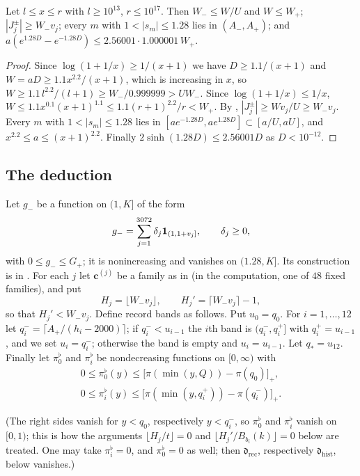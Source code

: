 \documentclass[11pt,colorlinks]{charlie}
\begin{document}
\begin{lemma}\label{lem:windows}
Let $l\le x\le r$ with $l\ge10^{13}$, $r\le10^{17}$. Then $W_-\le W/U$ and $W\le W_+$; $|J_j^\pm|\ge W_-v_j$; every $m$ with $1<|s_m|\le1.28$ lies in $(A_-,A_+)$; and $a(e^{1.28D}-e^{-1.28D})\le2.56001\cdot1.000001\,W_+$.
\end{lemma}
\begin{proof}
Since $\log(1+1/x)\ge1/(x+1)$ we have $D\ge1.1/(x+1)$ and $W=aD\ge1.1x^{2.2}/(x+1)$, which is increasing in $x$, so $W\ge1.1\,l^{2.2}/(l+1)\ge W_-/0.999999>UW_-$. Since $\log(1+1/x)\le1/x$, $W\le1.1x^{0.1}(x+1)^{1.1}\le1.1(r+1)^{2.2}/r<W_+$. By , $|J_j^\pm|\ge Wv_j/U\ge W_-v_j$. Every $m$ with $1<|s_m|\le1.28$ lies in $[ae^{-1.28D},ae^{1.28D}]\subset[a/U,aU]$, and $x^{2.2}\le a\le(x+1)^{2.2}$. Finally $2\sinh(1.28D)\le2.56001D$ as $D<10^{-12}$.
\end{proof}

\subsection{The deduction}\label{sec:deduction}
Let $g_-$ be a function on $(1,K]$ of the form
\begin{equation}\label{eq:gminus}
 g_-=\sum_{j=1}^{3072}\delta_j\mathbf{1}_{(1,1+v_j]},\qquad\delta_j\ge0,
\end{equation}
with $0\le g_-\le G_+$; it is nonincreasing and vanishes on $(1.28,K]$. Its construction is in . For each $j$ let $\mathbf c^{(j)}$ be a family as in  (in the computation, one of $48$ fixed families), and put
\[
 H_j=\lfloor W_-v_j\rfloor,\qquad H_j'=\lceil W_-v_j\rceil-1,
\]
so that $H_j'<W_-v_j$. Define record bands as follows. Put $u_0=q_0$. For $i=1,\dots,12$ let $q_i^-=\lceil A_+/(h_i-2000)\rceil$; if $q_i^-<u_{i-1}$ the $i$th band is $(q_i^-,q_i^+]$ with $q_i^+=u_{i-1}$, and we set $u_i=q_i^-$; otherwise the band is empty and $u_i=u_{i-1}$. Let $q_*=u_{12}$. Finally let $\pi_0^\flat$ and $\pi_i^\flat$ be nondecreasing functions on $[0,\infty)$ with
\begin{equation}\label{eq:piflat}
\begin{gathered}
 0\le\pi_0^\flat(y)\le\big[\pi(\min(y,Q))-\pi(q_0)\big]_+,\\
 0\le\pi_i^\flat(y)\le\big[\pi(\min(y,q_i^+))-\pi(q_i^-)\big]_+ .
\end{gathered}
\end{equation}

(The right sides vanish for $y<q_0$, respectively $y<q_i^-$, so $\pi_0^\flat$ and $\pi_i^\flat$ vanish on $[0,1)$; this is how the arguments $\lfloor H_j/t\rfloor=0$ and $\lfloor H_j'/B_{b_i}(k)\rfloor=0$ below are treated. One may take $\pi_i^\flat=0$, and $\pi_0^\flat=0$ as well; then $\mathfrak d_{\mathrm{rec}}$, respectively $\mathfrak d_{\mathrm{hist}}$, below vanishes.)
\end{document}
